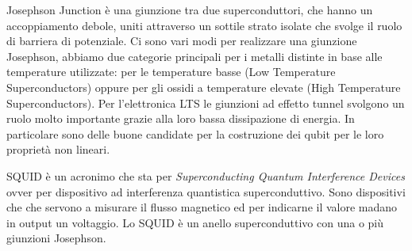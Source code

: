 Josephson Junction è una giunzione tra due superconduttori, che hanno un accoppiamento debole, uniti attraverso un sottile strato isolate che svolge il ruolo di barriera di potenziale. Ci sono vari modi per realizzare una giunzione Josephson, abbiamo due categorie principali per i metalli distinte in base alle temperature utilizzate: per le temperature basse  (Low Temperature Superconductors) oppure per gli ossidi a temperature elevate  (High Temperature Superconductors). Per l'elettronica LTS le giunzioni ad effetto tunnel svolgono un ruolo molto importante grazie alla loro bassa dissipazione di energia. In particolare sono delle buone candidate per la costruzione dei qubit per le loro proprietà non lineari.

SQUID è un acronimo che sta per \textit{Superconducting Quantum Interference Devices} ovver per dispositivo ad interferenza quantistica superconduttivo. Sono dispositivi che che servono a misurare il flusso magnetico ed per indicarne il valore madano in output un voltaggio. Lo SQUID è un anello superconduttivo con una o più giunzioni Josephson.


